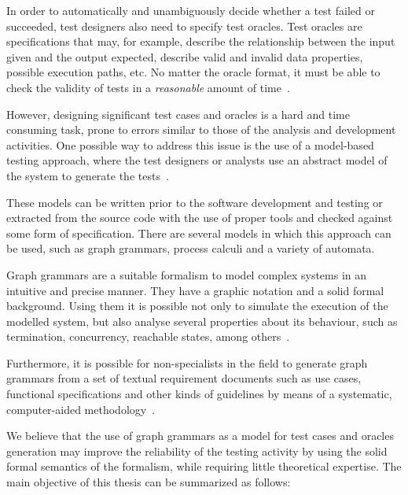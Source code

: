 In order to automatically and unambiguously decide whether a test failed or succeeded, test designers also need to specify test oracles. Test oracles are specifications that may, for example, describe the relationship between the input given and the output expected, describe valid and invalid data properties, possible execution paths, etc. No matter the oracle format, it must be able to check the validity of tests in a \textit{reasonable} amount of time~\cite{Weyuker1982}.

However, designing significant test cases and oracles is a hard and time consuming task, prone to errors similar to those of the analysis and development activities. One possible way to address this issue is the use of a model-based testing approach, where the test designers or analysts use an abstract model of the system to generate the tests~\cite{Utting2006}. 

These models can be written prior to the software development and testing or extracted from the source code with the use of proper tools and checked against some form of specification. There are several models in which this approach can be used, such as graph grammars, process calculi and a variety of automata.

Graph grammars are a suitable formalism to model complex systems in an intuitive and precise manner. They have a graphic notation and a solid formal background.  Using them it is possible not only to simulate the execution of the modelled system, but also analyse several properties about its behaviour, such as termination, concurrency, reachable states, among others~\cite{Ehrig2006}.

Furthermore, it is possible for non-specialists in the field to generate graph grammars from a set of textual requirement documents such as use cases, functional specifications and other kinds of guidelines by means of a systematic, computer-aided methodology~\cite{Junior2015,BezerraWEIT2016,Cota2017}.

We believe that the use of graph grammars as a model for test cases and oracles generation may improve the reliability of the testing activity by using the solid formal semantics of the formalism, while requiring little theoretical expertise. The main objective of this thesis can be summarized as follows:

\begin{intuition}
\end{intuition}\hfill\break

